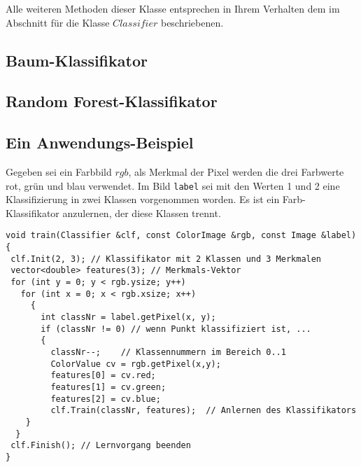 


Alle weiteren Methoden dieser Klasse entsprechen in Ihrem 
Verhalten dem im Abschnitt für die Klasse $Classifier$ beschriebenen.

\subsection{Baum-Klassifikator}
\subsection{Random Forest-Klassifikator}

\subsection{Ein Anwendungs-Beispiel}
Gegeben sei ein Farbbild $rgb$, als Merkmal der Pixel werden die 
drei Farbwerte rot, grün und blau verwendet.
Im Bild \verb+label+ sei mit den Werten 1 und 2 eine Klassifizierung 
in zwei Klassen vorgenommen worden. Es ist ein Farb-Klassifikator 
anzulernen, der diese Klassen trennt.

\begprogr\begin{verbatim}
void train(Classifier &clf, const ColorImage &rgb, const Image &label)
{
 clf.Init(2, 3); // Klassifikator mit 2 Klassen und 3 Merkmalen
 vector<double> features(3); // Merkmals-Vektor
 for (int y = 0; y < rgb.ysize; y++)
   for (int x = 0; x < rgb.xsize; x++)
     {
       int classNr = label.getPixel(x, y);
       if (classNr != 0) // wenn Punkt klassifiziert ist, ...
       {
         classNr--;    // Klassennummern im Bereich 0..1
         ColorValue cv = rgb.getPixel(x,y);
         features[0] = cv.red;
         features[1] = cv.green;
         features[2] = cv.blue;
         clf.Train(classNr, features);  // Anlernen des Klassifikators
    }
  }
 clf.Finish(); // Lernvorgang beenden
}
\end{verbatim}\endprogr

